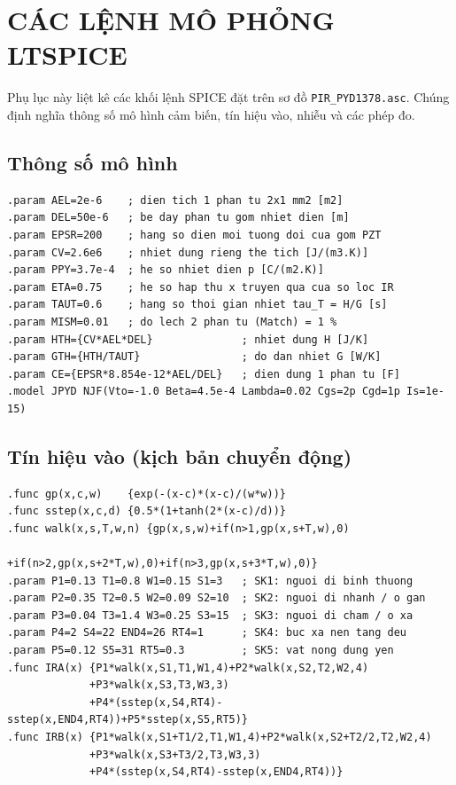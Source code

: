 \chapter{CÁC LỆNH MÔ PHỎNG LTSPICE}
\label{app:ltspice}

Phụ lục này liệt kê các khối lệnh SPICE đặt trên sơ đồ \texttt{PIR\_PYD1378.asc}. Chúng định nghĩa thông số mô hình cảm biến, tín hiệu vào, nhiễu và các phép đo.

\section{Thông số mô hình \PYD{}}
{\small
\begin{verbatim}
.param AEL=2e-6    ; dien tich 1 phan tu 2x1 mm2 [m2]
.param DEL=50e-6   ; be day phan tu gom nhiet dien [m]
.param EPSR=200    ; hang so dien moi tuong doi cua gom PZT
.param CV=2.6e6    ; nhiet dung rieng the tich [J/(m3.K)]
.param PPY=3.7e-4  ; he so nhiet dien p [C/(m2.K)]
.param ETA=0.75    ; he so hap thu x truyen qua cua so loc IR
.param TAUT=0.6    ; hang so thoi gian nhiet tau_T = H/G [s]
.param MISM=0.01   ; do lech 2 phan tu (Match) = 1 %
.param HTH={CV*AEL*DEL}              ; nhiet dung H [J/K]
.param GTH={HTH/TAUT}                ; do dan nhiet G [W/K]
.param CE={EPSR*8.854e-12*AEL/DEL}   ; dien dung 1 phan tu [F]
.model JPYD NJF(Vto=-1.0 Beta=4.5e-4 Lambda=0.02 Cgs=2p Cgd=1p Is=1e-15)
\end{verbatim}
}

\section{Tín hiệu vào (kịch bản chuyển động)}
{\small
\begin{verbatim}
.func gp(x,c,w)    {exp(-(x-c)*(x-c)/(w*w))}
.func sstep(x,c,d) {0.5*(1+tanh(2*(x-c)/d))}
.func walk(x,s,T,w,n) {gp(x,s,w)+if(n>1,gp(x,s+T,w),0)
                       +if(n>2,gp(x,s+2*T,w),0)+if(n>3,gp(x,s+3*T,w),0)}
.param P1=0.13 T1=0.8 W1=0.15 S1=3   ; SK1: nguoi di binh thuong
.param P2=0.35 T2=0.5 W2=0.09 S2=10  ; SK2: nguoi di nhanh / o gan
.param P3=0.04 T3=1.4 W3=0.25 S3=15  ; SK3: nguoi di cham / o xa
.param P4=2 S4=22 END4=26 RT4=1      ; SK4: buc xa nen tang deu
.param P5=0.12 S5=31 RT5=0.3         ; SK5: vat nong dung yen
.func IRA(x) {P1*walk(x,S1,T1,W1,4)+P2*walk(x,S2,T2,W2,4)
             +P3*walk(x,S3,T3,W3,3)
             +P4*(sstep(x,S4,RT4)-sstep(x,END4,RT4))+P5*sstep(x,S5,RT5)}
.func IRB(x) {P1*walk(x,S1+T1/2,T1,W1,4)+P2*walk(x,S2+T2/2,T2,W2,4)
             +P3*walk(x,S3+T3/2,T3,W3,3)
             +P4*(sstep(x,S4,RT4)-sstep(x,END4,RT4))}
\end{verbatim}
}

